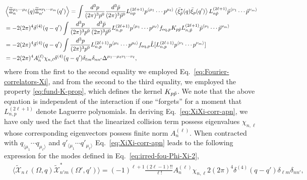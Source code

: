 \documentclass[aps,prd,preprint,nofootinbib,amsmath,amssymb,showpacs,longbibliography,singlecolumn,superscriptaddress,10pt]{revtex4-1}
\theoremstyle{plain}
\theoremstyle{definition}
\begin{document}
%
\begin{equation}
\label{eq:XiXi-corr-apn}
\begin{aligned}
&
\left\langle \widetilde{\Xi}_{n}^{\mu_{1} \cdots \mu_{\ell}}(q) \widetilde{\Xi}_{n'}^{*\nu_{1} \cdots \nu_{m}}(q')
\right\rangle
=
\int \dfrac{d^3 p}{(2\pi)^3 p^0} \dfrac{d^3 \Bar{p}}{(2\pi)^3 \Bar{p}^0}  L^{(2 \ell + 1)}_{n p} p^{\langle \mu_{1}} \cdots p^{ \mu_{\ell} \rangle}
\left\langle \Bar{\xi}^{*}_{\Tilde{p}}(q)
 \Bar{\xi}_p(q')
 \right\rangle
 L^{(2 \ell + 1)}_{n \tilde{p}} \tilde{p}^{\langle \nu_{1}} \cdots \tilde{p}^{ \nu_{m} \rangle}
\\
&
=
- 2 (2 \pi)^{4} \delta^{(4)}(q-q')
\int \dfrac{d^3 p}{(2\pi)^3 p^0} \dfrac{d^3 \Bar{p}}{(2\pi)^3 \Bar{p}^0} L^{(2 \ell + 1)}_{n,p} p^{\langle \mu_{1}} \cdots p^{ \mu_{\ell} \rangle}
f_{\mathrm{eq},p}K_{p \tilde{p}}
 L^{(2 \ell + 1)}_{n, \tilde{p} } \tilde{p}^{\langle \nu_{1}} \cdots \tilde{p}^{ \nu_{m} \rangle}
\\
&
=
- 2 (2 \pi)^{4} \delta^{(4)}(q-q')
\int \dfrac{d^3 p}{(2\pi)^3 p^0} L^{(2 \ell + 1)}_{n,p} p^{\langle \mu_{1}} \cdots p^{ \mu_{\ell} \rangle}
f_{\mathrm{eq},p} \Hat{L}[L^{(2 \ell + 1)}_{n, p} p^{\langle \nu_{1}} \cdots p^{ \nu_{m} \rangle}]
\\
&
= 
-2 (2 \pi)^{4} A_{n}^{(\ell)} \chi_{n,\ell}  \delta^{(4)}(q-q') \delta_{\ell m} \delta_{nn'} \Delta^{\mu_{1} \cdots \mu_{\ell}\nu_{1} \cdots \nu_{\ell}},
\end{aligned}    
\end{equation}
%
where from the first to the second equality we employed Eq.~\eqref{eq:Fourier-correlators-Xi}, and from the second to the third equality, we employed the property \eqref{eq:fund-K-prop}, which defines the kernel $K_{p \Tilde{p}}$. We note that the above equation is independent of the interaction if one ``forgets'' for a moment that $L^{(2 \ell + 1)}_{n,p}$ denote Laguerre polynomials. In deriving Eq.~\eqref{eq:XiXi-corr-apn}, we have only used the fact that the linearized collision term possess eigenvalues $\chi_{n,\ell}$ whose corresponding eigenvectors possess finite norm $A_{n}^{(\ell)}$. When contracted with $q_{\langle \mu_{1}} \cdots q_{ \mu_{\ell} \rangle}$ and $q'_{\langle \mu_{1}} \cdots q'_{ \mu_{\ell} \rangle}$ Eq.~\eqref{eq:XiXi-corr-apn} leads to the following expression for the modes defined in Eq.~\eqref{eq:irred-fou-Phi-Xi-2},
%
\begin{equation}
\label{eq:corr-X-components-apn}
\begin{aligned}
&
\langle \widetilde{\mathcal{X}}_{n\ell}(\Omega, q) \widetilde{\mathcal{X}}^{*}_{n'm}(\Omega', q') \rangle
=
(-1)^{\ell+1}\frac{(2 \ell - 1)!!}{\ell!}
A_{n}^{(\ell)} \chi_{n,\ell} 2 (2 \pi)^{4} \delta^{(4)}(q-q') \delta_{\ell m} \delta_{nn'},
\end{aligned}    
\end{equation}
\end{document}
